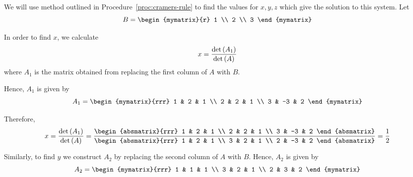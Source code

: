 \begin{solution} We will use method outlined in Procedure~\ref{proc:cramers-rule} to find the values for
$x,y,z$ which give the solution to this system. 
Let
\begin{equation*}
B = 
\begin{mymatrix}{r}
1 \\
2 \\
3
\end{mymatrix} 
\end{equation*}

In order to find $x$, we calculate
\begin{equation*}
x =
\vspace{0.05in}\frac{\det \tup{A_{1}}}{\det \tup{A}}
\end{equation*}
where $A_1$ is the matrix obtained from replacing the first column of $A$ with $B$.

Hence, $A_1$ is given by 
\begin{equation*}
A_1 = 
\begin{mymatrix}{rrr}
1 & 2 & 1 \\
2 & 2 & 1 \\
3 & -3 & 2
\end{mymatrix}
\end{equation*}

Therefore,
\begin{equation*}
x=
\vspace{0.05in}\frac{\det \tup{A_{1}}}{\det \tup{A}}
=
\vspace{0.05in}\frac{\begin{absmatrix}{rrr}
1 &  2 & 1 \\
2 &  2 & 1 \\
3 & -3 & 2
\end{absmatrix} }{\begin{absmatrix}{rrr}
1 & 2 & 1 \\
3 & 2 & 1 \\
2 & -3 & 2
\end{absmatrix} }=\vspace{0.05in}\frac{1}{2}
\end{equation*}

Similarly, to find $y$ we construct $A_2$ by replacing the second column of $A$ with $B$. Hence, $A_2$ is given by
\begin{equation*}
A_2
=
\begin{mymatrix}{rrr}
1 & 1 & 1 \\
3 & 2 & 1 \\
2 & 3 & 2
\end{mymatrix}
\end{equation*}


\end{solution}
